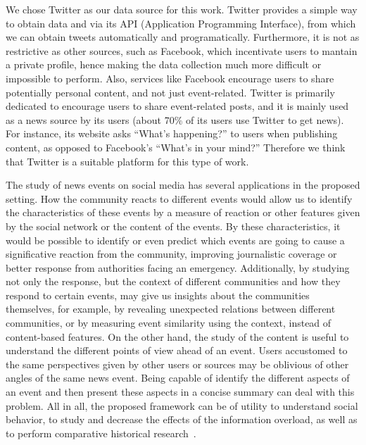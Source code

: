 \begin{intro}
We chose Twitter as our data source for this work. 
%
Twitter provides a simple way to obtain data and via its API (Application
Programming Interface), from which we can obtain tweets automatically and
programatically.
%
Furthermore, it is not as restrictive as other sources, such as Facebook, which
incentivate users to mantain a private profile, hence making the data collection
much more difficult or impossible to perform.
%
Also, services like Facebook encourage users to share potentially personal
content, and not just event-related.
%
Twitter is primarily dedicated to encourage users to share event-related posts,
and it is mainly used as a news source by its users (about 70\% of its users use
Twitter to get news). 
%
For instance, its website asks “What’s happening?” to users when publishing
content, as opposed to Facebook’s “What’s in your mind?”
%
Therefore we think that Twitter is a suitable platform for this type of work.


The study of news events on social media has several applications in the
proposed setting. 
%
How the community reacts to different events would allow us to identify the
characteristics of these events by a measure of reaction or other features given
by the social network or the content of the events. 
%
By these characteristics, it would be possible to identify or even predict which
events are going to cause a significative reaction from the community, improving
journalistic coverage or better response from authorities facing an emergency.
%
Additionally, by studying not only the response, but the context of different
communities and how they respond to certain events, may give us insights about
the communities themselves, for example, by revealing unexpected relations
between different communities, or by measuring event similarity using the
context, instead of content-based features. 
%
On the other hand, the study of the content is useful to understand the
different points of view ahead of an event. 
%
Users accustomed to the same perspectives given by other users or sources may be
oblivious of other angles of the same news event. 
%
Being capable of identify the different aspects of an event and then present
these aspects in a concise summary can deal with this problem. 
%
All in all, the proposed framework can be of utility to understand social
behavior, to study and decrease the effects of the information overload, as well
as to perform comparative historical research~\cite{wiki:comparative}.


\end{intro}
